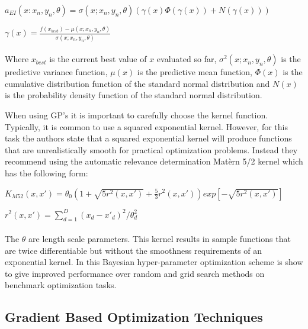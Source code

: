 \documentclass[12pt,letterpaper]{article}
\begin{document}
$a_{EI}(x:{x_n,y_n}, \theta)= \sigma(x;{x_n,y_n},\theta) (\gamma(x) \Phi(\gamma(x)) + N(\gamma(x)))$


$\gamma(x) = \frac{f(x_{best}) - \mu(x;{x_n,y_n}, \theta)}{\sigma(x;{x_n,y_n},\theta)}$
\\
\\
Where $x_{best}$ is the current best value of $x$ evaluated so far, $\sigma^2(x;{x_n,y_n},\theta)$ is the predictive variance function, $\mu(x)$ is the predictive mean function, $\Phi(x)$ is the cumulative distribution function of the standard normal distribution and $N(x)$ is the probability density function of the standard normal distribution.

When using GP's it is important to carefully choose the kernel function.  Typically, it is common to use a squared exponential kernel.  However, for this task the authors state that a squared exponential kernel will produce functions that are unrealistically smooth for practical optimization problems.  Instead they recommend using the automatic relevance determination Mat\`ern 5/2 kernel which has the following form:

$K_{M52}(x,x') = \theta_0(1 + \sqrt{5r^2(x,x')} + \frac{5}{3}r^2(x,x'))exp[-\sqrt{5r^2(x,x')}]$

$r^2(x,x') = \sum_{d=1}^{D}(x_d - x'_d)^2/\theta_d^2$
\\
\\
The $\theta$ are length scale parameters.  This kernel results in sample functions that are twice differentiable but without the smoothness requirements of an exponential kernel.  In \cite{Snoek:2012:PBO:2999325.2999464} this Bayesian hyper-parameter optimization scheme is show to give improved performance over random and grid search methods on benchmark optimization tasks.

\subsection{Gradient Based Optimization Techniques}
\end{document}
